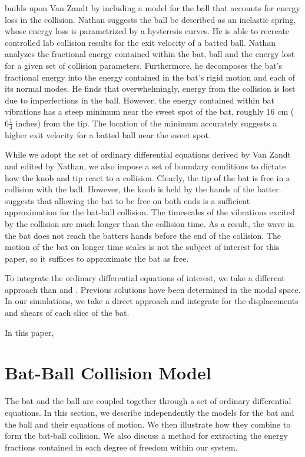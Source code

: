 \documentclass[linenumbers]{aastex7}
\begin{document}
\cite{nathanDynamicsBaseballBat2000a} builds upon Van Zandt by including a model for the ball that accounts for energy loss in the collision. Nathan suggests the ball be described as an inelastic spring, whose energy loss is parametrized by a hysteresis curves. He is able to recreate controlled lab collision results for the exit velocity of a batted ball. Nathan analyzes the fractional energy contained within the bat, ball and the energy lost for a given set of collision parameters. Furthermore, he decomposes the bat's fractional energy into the energy contained in the bat's rigid motion and each of its normal modes. He finds that overwhelmingly, energy from the collision is lost due to imperfections in the ball. However, the energy contained within bat vibrations has a steep minimum near the sweet spot of the bat, roughly 16 cm (\(6\tfrac{1}{4}\) inches) from the tip. The location of the minimum accurately suggests a higher exit velocity for a batted ball near the sweet spot.

While we adopt the set of ordinary differential equations derived by Van Zandt and edited by Nathan, we also impose a set of boundary conditions to dictate how the knob and tip react to a collision. Clearly, the tip of the bat is free in a collision with the ball. However, the knob is held by the hands of the batter. \citet{crossSweetSpotBaseball1998} suggests that allowing the bat to be free on both ends is a sufficient approximation for the bat-ball collision. The timescales of the vibrations excited by the collision are much longer than the collision time. As a result, the wave in the bat does not reach the batters hands before the end of the collision. The motion of the bat on longer time scales is not the subject of interest for this paper, so it suffices to approximate the bat as free.

To integrate the ordinary differential equations of interest, we take a different approach than \cite{nathanDynamicsBaseballBat2000a} and \cite{vanzandtDynamicalTheoryBaseball1992}. Previous solutions have been determined in the modal space. In our simulations, we take a direct approach and integrate for the displacements and shears of each slice of the bat.

In this paper,

\section{Bat-Ball Collision Model}
The bat and the ball are coupled together through a set of ordinary differential equations. In this section, we describe independently the models for the bat and the ball and their equations of motion. We then illustrate how they combine to form the bat-ball collision. We also discuss a method for extracting the energy fractions contained in each degree of freedom within our system.
\end{document}
